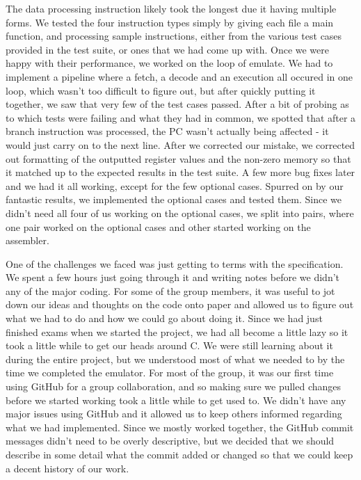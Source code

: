 \documentclass[11pt]{article}
\begin{document}
The data processing instruction likely took the longest due it having multiple forms. We tested the four instruction types simply by giving each file a main function, and processing sample instructions, either from the various test cases provided in the test suite, or ones that we had come up with. Once we were happy with their performance, we worked on the loop of emulate. We had to implement a pipeline where a fetch, a decode and an execution all occured in one loop, which wasn't too difficult to figure out, but after quickly putting it together, we saw that very few of the test cases passed. After a bit of probing as to which tests were failing and what they had in common, we spotted that after a branch instruction was processed, the PC wasn't actually being affected - it would just carry on to the next line. After we corrected our mistake, we corrected out formatting of the outputted register values and the non-zero memory so that it matched up to the expected results in the test suite. A few more bug fixes later and we had it all working, except for the few optional cases. Spurred on by our fantastic results, we implemented the optional cases and tested them. Since we didn't need all four of us working on the optional cases, we split into pairs, where one pair worked on the optional cases and other started working on the assembler.

One of the challenges we faced was just getting to terms with the specification. We spent a few hours just going through it and writing notes before we didn't any of the major coding. For some of the group members, it was useful to jot down our ideas and thoughts on the code onto paper and allowed us to figure out what we had to do and how we could go about doing it. Since we had just finished exams when we started the project, we had all become a little lazy so it took a little while to get our heads around C. We were still learning about it during the entire project, but we understood most of what we needed to by the time we completed the emulator. For most of the group, it was our first time using GitHub for a group collaboration, and so making sure we pulled changes before we started working took a little while to get used to. We didn't have any major issues using GitHub and it allowed us to keep others informed regarding what we had implemented. Since we mostly worked together, the GitHub commit messages didn't need to be overly descriptive, but we decided that we should describe in some detail what the commit added or changed so that we could keep a decent history of our work.
\end{document}
